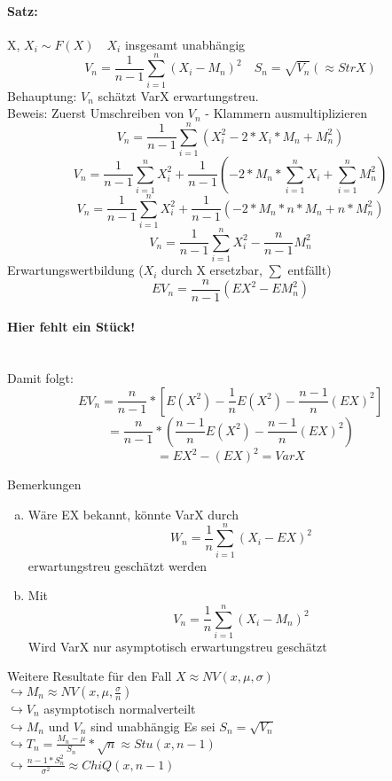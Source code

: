 \documentclass[a4paper,12pt]{scrartcl}
\begin{document}
  \paragraph{Satz:} X, $X_i\sim F(X)\quad X_i$ insgesamt unabhängig
  $$V_n = \frac{1}{n-1}\sum_{i=1}^n(X_i-M_n)^2\quad S_n=\sqrt{V_n}(\approx StrX)$$
  Behauptung: $V_n$ schätzt VarX erwartungstreu.\\
  Beweis: Zuerst Umschreiben von $V_n$ - Klammern ausmultiplizieren
  $$V_n =\frac{1}{n-1}\sum_{i=1}^n(X_i^2-2*X_i*M_n+M_n^2)$$
  $$V_n =\frac{1}{n-1}\sum_{i=1}^nX_i^2+\frac{1}{n-1}(-2*M_n*\sum_{i=1}^nX_i + \sum_{i=1}^n M_n^2)$$
  $$V_n =\frac{1}{n-1}\sum_{i=1}^nX_i^2+\frac{1}{n-1}(-2*M_n*n*M_n+n*M_n^2) $$
  $$V_n =\frac{1}{n-1}\sum_{i=1}^nX_i^2-\frac{n}{n-1}M_n^2$$
  Erwartungswertbildung ($X_i$ durch X ersetzbar, $\sum$ entfällt)
  $$EV_n = \frac{n}{n-1}(EX^2-EM_n^2) $$
 
  \paragraph{Hier fehlt ein Stück!}\quad \\
  
  Damit folgt:
  $$EV_n = \frac{n}{n-1}*[E(X^2)-\frac{1}{n}E(X^2)-\frac{n-1}{n}(EX)^2]$$
  $$=\frac{n}{n-1}*(\frac{n-1}{n}E(X^2)-\frac{n-1}{n}(EX)^2)$$
  $$=EX^2-(EX)^2=VarX$$
  
  Bemerkungen
  \begin{enumerate}[(a)]
   \item Wäre EX bekannt, könnte VarX durch
   $$W_n = \frac{1}{n}\sum_{i=1}^n(X_i-EX)^2 $$
   erwartungstreu geschätzt werden
   \item Mit
   $$V_n = \frac{1}{n}\sum^n_{i=1}(X_i-M_n)^2$$
   Wird VarX nur asymptotisch erwartungstreu geschätzt
  \end{enumerate}

  Weitere Resultate für den Fall $X\approx NV(x,\mu,\sigma)$\\
  $\hookrightarrow M_n\approx NV(x,\mu,\frac{\sigma}{n})$\\
  $\hookrightarrow V_n$ asymptotisch normalverteilt\\
  $\hookrightarrow M_n$ und $V_n$ sind unabhängig
  Es sei $S_n = \sqrt{V_n}$\\
  $\hookrightarrow T_n = \frac{M_n-\mu}{S_n} * \sqrt{n} \approx Stu(x,n-1)$\\
  $\hookrightarrow \frac{n-1*S^2_n}{\sigma^2}\approx ChiQ(x,n-1)$\\
  
\end{document}
